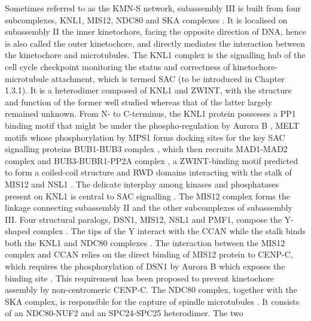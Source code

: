 Sometimes referred to as the KMN-S network, subassembly III is built from four subcomplexes, KNL1, MIS12, NDC80 and SKA complexes \citep{DeWulf2003HierarchicalSubcomplexes, Theis2009ComparativeDivision, Bharadwaj2004IdentificationComplex, McCleland2003TheActivity, Desai2003KNL-1Elegans, Obuse2004AZwint-1, Wigge2001TheSegregation, Westermann2003ArchitectureCore, Cheeseman2004ATension, Cheeseman2006TheKinetochore, Nekrasov2003InteractionsCerevisiae, Pinsky2003AnKinase, Kline2006, Welburn2009TheMotility, Gaitanos2009StableSka3/C13Orf3}. It is localised on subassembly II the inner kinetochore, facing the opposite direction of DNA, hence is also called the outer kinetochore, and directly mediates the interaction between the kinetochore and microtubules. The KNL1 complex is the signalling hub of the cell cycle checkpoint monitoring the status and correctness of kinetochore-microtubule attachment, which is termed SAC (to be introduced in Chapter 1.3.1). It is a heterodimer composed of KNL1 and ZWINT, with the structure and function of the former well studied whereas that of the latter largely remained unknown. From N- to C-terminus, the KNL1 protein possesses a PP1 binding motif that might be under the phospho-regulation by Aurora B \citep{Liu2010RegulatedKinase, Rosenberg2011KNL1/Spc105Checkpoint, Roy2019}, MELT motifs whose phosphorylation by MPS1 forms docking sites for the key SAC signalling proteins BUB1-BUB3 complex \citep{Cheeseman2004ATension, Primorac2013Bub3Signaling, Shepperd2012, Yamagishi2012MPS1/Mph1Components, Vleugel2013ArrayedSegregation, London2012}, which then recruits MAD1-MAD2 complex and BUB3-BUBR1-PP2A complex \citep{Suijkerbuijk2012IntegrationAttachments, Kruse2013DirectProgression, Krenn2012StructuralInteraction}, a ZWINT-binding motif predicted to form a coiled-coil structure \citep{Petrovic2010TheAssembly} and RWD domains interacting with the stalk of MIS12 and NSL1 \citep{Petrovic2014ModularOrganization}. The delicate interplay among kinases and phosphatases present on KNL1 is central to SAC signalling \citep{Saurin2018KinaseKinetochore}. The MIS12 complex forms the linkage connecting subassembly II and the other subcomplexes of subassembly III. Four structural paralogs, DSN1, MIS12, NSL1 and PMF1, compose the Y-shaped complex \citep{Petrovic2010TheAssembly, Petrovic2016StructureKinetochores, Dimitrova2016StructureAssembly, Hornung2011MolecularComplex, Maskell2010MolecularComplex}. The tips of the Y interact with the CCAN \citep{Screpanti2011DirectKinetochore} while the stalk binds both the KNL1 and NDC80 complexes \citep{Petrovic2014ModularOrganization}. The interaction between the MIS12 complex and CCAN relies on the direct binding of MIS12 protein to CENP-C, which requires the phosphorylation of DSN1 by Aurora B which exposes the binding site \citep{Kim2015, Akiyoshi2013TheYeast, Bonner2019EnrichmentAssembly, Hara2018MultipleKinetochores, Rago2015DistinctCENP-T, Zhou2017PhosphorylationMitosis}. This requirement has been proposed to prevent kinetochore assembly by non-centromeric CENP-C. The NDC80 complex, together with the SKA complex, is responsible for the capture of spindle microtubules \citep{Cheeseman2006TheKinetochore, Wimbish2020Hec1/Ndc80Interface, DeLuca2006KinetochoreHec1}. It consists of an NDC80-NUF2 and an SPC24-SPC25 heterodimer. The two 
